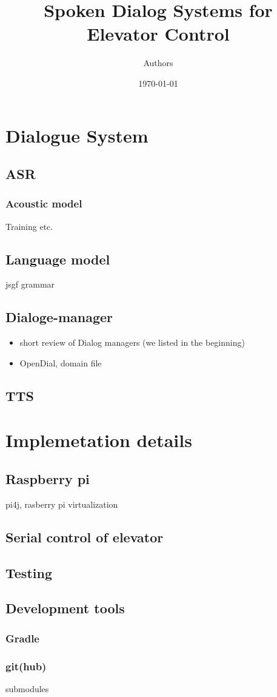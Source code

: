 \documentclass[11pt]{article}
\title{Spoken Dialog Systems for Elevator Control}
\author{Authors}
\date{\today}
\begin{document}
\maketitle


\section*{Dialogue System}
\subsection*{ASR}
\subsubsection*{Acoustic model}
Training etc.
\subsection*{Language model}
jsgf grammar
\subsection*{Dialoge-manager}
\begin{itemize}
\item
short review of Dialog managers (we listed in the beginning)
\item 
OpenDial, domain file
\end{itemize}
\subsection*{TTS}

\section*{Implemetation details}
\subsection*{Raspberry pi}
pi4j, rasberry pi virtualization
\subsection*{Serial control of elevator}
\subsection*{Testing}
\subsection*{Development tools}
\subsubsection*{Gradle}
\subsubsection*{git(hub)}
submodules

\end{document}
